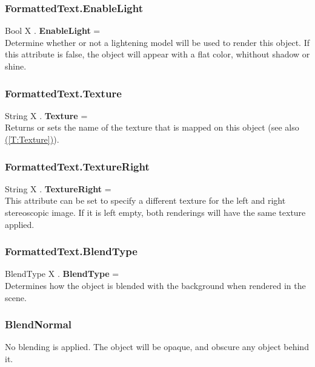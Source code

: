 \documentclass[10pt]{book}
\newcommand{\linkitem}[1]{\hyperref[#1]{\nameref{#1} (\ref{#1})}}
\begin{document}
\subsubsection{FormattedText.EnableLight \label{F:FormattedText:EnableLight}}
Bool X . \textbf{EnableLight} = \\
Determine whether or not a lightening model will be used to render this object. If this attribute is false, the object will appear with a flat color, whithout shadow or shine.

\subsubsection{FormattedText.Texture \label{F:FormattedText:Texture}}
String X . \textbf{Texture} = \\
Returns or sets the name of the texture that is mapped on this object (see also \linkitem{T:Texture}).

\subsubsection{FormattedText.TextureRight \label{F:FormattedText:TextureRight}}
String X . \textbf{TextureRight} = \\
This attribute can be set to specify a different texture for the left and right stereoscopic image. If it is left empty, both renderings will have the same texture applied.

\subsubsection{FormattedText.BlendType \label{F:FormattedText:BlendType}}
BlendType X . \textbf{BlendType} = \\
Determines how the object is blended with the background when rendered in the scene.

\subsubsection{BlendNormal \label{T:BlendType|BlendNormal}}
No blending is applied. The object will be opaque, and obscure any object behind it.
\end{document}
